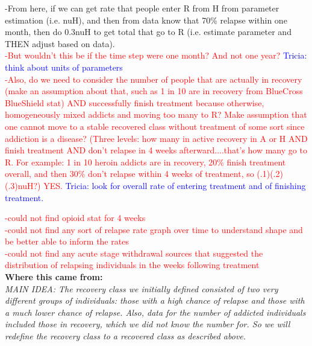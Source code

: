 \documentclass[12pt]{article}
\begin{document}
-From here, if we can get rate that people enter R from H from parameter estimation (i.e. nuH), and then from data know that 70\% relapse within one month, then do 0.3nuH to get total that go to R  (i.e. estimate parameter and THEN adjust based on data).\\ 
\textcolor{red}{-But wouldn't this be if the time step were one month? And not one year? \textcolor{blue}{Tricia: think about units of parameters} \\
-Also, do we need to consider the number of people that are actually in recovery (make an assumption about that, such as 1 in 10 are in recovery from BlueCross BlueShield stat) AND successfully finish treatment because otherwise, homogeneously mixed addicts and moving too many to R? Make assumption that one cannot move to a stable recovered class without treatment of some sort since addiction is a disease? (Three levels: how many in active recovery in A or H AND finish treatment AND don't relapse in 4 weeks afterward....that's how many go to R. For example: 1 in 10 heroin addicts are in recovery, 20\% finish treatment overall, and then 30\% don't relapse within 4 weeks of treatment, so (.1)(.2)(.3)nuH?) YES.} \textcolor{blue}{Tricia: look for overall rate of entering treatment and of finishing treatment.\\}

\textcolor{red}{-could not find opioid stat for 4 weeks \\
-could not find any sort of relapse rate graph over time to understand shape and be better able to inform the rates \\
-could not find any acute stage withdrawal sources that suggested the distribution of relapsing individuals in the weeks following treatment}  \\


\textbf{Where this came from:} \\

\textit{MAIN IDEA: The recovery class we initially defined consisted of two very different groups of individuals: those with a high chance of relapse and those with a much lower chance of relapse. Also, data for the number of addicted individuals included those in recovery, which we did not know the number for. So we will redefine the recovery class to a recovered class as described above.} \\
\end{document}
